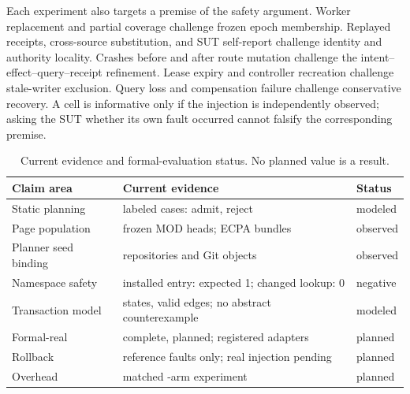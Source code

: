 \documentclass[letterpaper,twocolumn,10pt]{article}
\begin{document}
Each experiment also targets a premise of the safety argument.  Worker
replacement and partial coverage challenge frozen epoch membership.  Replayed
receipts, cross-source substitution, and SUT self-report challenge identity and
authority locality.  Crashes before and after route mutation challenge the
intent--effect--query--receipt refinement.  Lease expiry and controller
recreation challenge stale-writer exclusion.  Query loss and compensation
failure challenge conservative recovery.  A cell is informative only if the
injection is independently observed; asking the SUT whether its own fault
occurred cannot falsify the corresponding premise.

\begin{table}[t]
\centering
\small
\caption{Current evidence and formal-evaluation status.  No planned value is a
result.}
\begin{tabularx}{\columnwidth}{@{}lXl@{}}
\toprule
Claim area & Current evidence & Status \\
\midrule
Static planning & \ECPAPlannerCases{} labeled cases: \ECPAPlannerAdmits{} admit,
\ECPAPlannerRejects{} reject & modeled \\
Page population & \ECPAWorkshopMods{} frozen MOD heads; \ECPAWorkshopBundleNamespace{}
ECPA bundles & observed \\
Planner seed binding & \ECPASourceRepositories{} repositories and
\ECPASourceObjects{} Git objects & observed \\
Namespace safety & installed entry: expected 1; changed lookup: 0 & negative \\
Transaction model & \ECPATransactionModelStates{} states,
\ECPATransactionModelEdges{} valid edges; no abstract counterexample & modeled \\
Formal-real & \ECPAFormalCompleted{} complete, \ECPAFormalPlanned{} planned;
\ECPAVerifiedAdapters{} registered adapters & planned \\
Rollback & reference faults only; real injection pending & planned \\
Overhead & matched \ECPAFormalArms{}-arm experiment & planned \\
\bottomrule
\end{tabularx}
\end{table}
\end{document}
